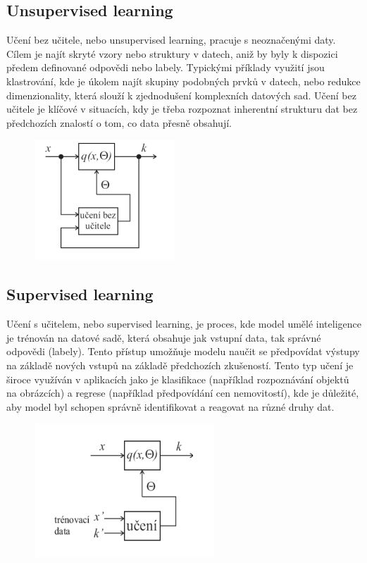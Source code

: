 \documentclass[12pt, a4paper,
twoside,        %
openright
]{report}
\begin{document}
\subsection{Unsupervised learning}
Učení bez učitele, nebo unsupervised learning, pracuje s neoznačenými daty. Cílem je najít skryté vzory nebo struktury v datech, aniž by byly k dispozici předem definované odpovědi nebo labely. Typickými příklady využití jsou klastrování, kde je úkolem najít skupiny podobných prvků v datech, nebo redukce dimenzionality, která slouží k zjednodušení komplexních datových sad. Učení bez učitele je klíčové v situacích, kdy je třeba rozpoznat inherentní strukturu dat bez předchozích znalostí o tom, co data přesně obsahují.
\begin{figure}[h]
	\centering
	\includegraphics{image/bezu.png} 
\end{figure}

\subsection{Supervised learning}
Učení s učitelem, nebo supervised learning, je proces, kde model umělé inteligence je trénován na datové sadě, která obsahuje jak vstupní data, tak správné odpovědi (labely). Tento přístup umožňuje modelu naučit se předpovídat výstupy na základě nových vstupů na základě předchozích zkušeností. Tento typ učení je široce využíván v aplikacích jako je klasifikace (například rozpoznávání objektů na obrázcích) a regrese (například předpovídání cen nemovitostí), kde je důležité, aby model byl schopen správně identifikovat a reagovat na různé druhy dat.
\begin{figure}[h]
	\centering
	\includegraphics{image/su.png} 
\end{figure}
\end{document}
